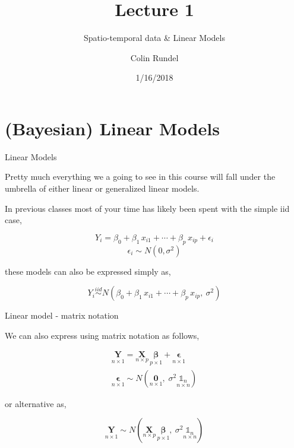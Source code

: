 \documentclass[11pt,ignorenonframetext,]{beamer}
\title{Lecture 1}
\subtitle{Spatio-temporal data \& Linear Models}
\author{Colin Rundel}
\date{1/16/2018}
\begin{document}
\frame{\titlepage}

\hypertarget{bayesian-linear-models}{%
\section{(Bayesian) Linear Models}\label{bayesian-linear-models}}

\begin{frame}[t]{Linear Models}
\protect\hypertarget{linear-models}{}

Pretty much everything we a going to see in this course will fall under
the umbrella of either linear or generalized linear models.

In previous classes most of your time has likely been spent with the
simple iid case,

\[Y_i = \beta_0 + \beta_1 \, x_{i1} + \cdots + \beta_p \, x_{ip} + \epsilon_i \]
\[ \epsilon_i \sim N(0, \sigma^2) \]

these models can also be expressed simply as,

\[ Y_i \overset{iid}{\sim} N(\beta_0 + \beta_1 \, x_{i1} + \cdots + \beta_p \, x_{ip},~ \sigma^2) \]

\end{frame}

\begin{frame}[t]{Linear model - matrix notation}
\protect\hypertarget{linear-model---matrix-notation}{}

We can also express using matrix notation as follows,

\[
\begin{aligned}
\underset{n \times 1}{\symbf{Y}} = \underset{n \times p}{\symbf{X}} \, \underset{p \times 1}{\symbf{\beta}} + \underset{n \times 1}{\symbf{\epsilon}} \\
\underset{n \times 1}{\symbf{\epsilon}} \sim N(\underset{n \times 1}{\symbf{0}}, \; \sigma^2 \underset{n \times n}{\mathbb{1}_n})
\end{aligned}
\]

or alternative as,

\[ 
\underset{n \times 1}{\symbf{Y}} \sim N\left(\underset{n \times p}{\symbf{X}} \, \underset{p \times 1}{\symbf{\beta}},~  \sigma^2 \underset{n \times n}{\mathbb{1}_n}\right)
\]

\end{frame}
\end{document}
